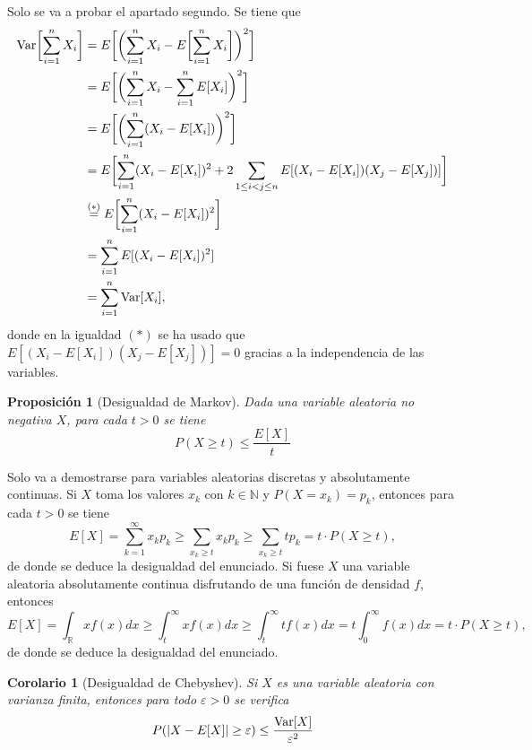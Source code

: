 \documentclass[11pt]{report}
\makeatletter
\renewenvironment{proof}[1][\proofname]{\par
  \pushQED{\qed}%
  \normalfont \topsep\z@skip %
  \trivlist
  \item[\hskip\labelsep
        \itshape
    #1\@addpunct{.}]\ignorespaces
}{%
  \popQED\endtrivlist\@endpefalse
}
\theoremstyle{mytheorem}
\newtheorem{proposition}{Proposición}
\newtheorem{corollary}{Corolario} %
\theoremstyle{mydefinition}
\theoremstyle{myexample}
\let\oldproofname=\proofname
\renewcommand{\proofname}{\rm\bf{\oldproofname}}}
\newenvironment{cproposition} %
  {\begin{mdframed}[
        linewidth=3pt,
        linecolor=c2,
        bottomline=false,
        topline=false,
        rightline=false,
        innerrightmargin=0pt,
        innertopmargin=0pt,
        innerbottommargin=0pt,
        innerleftmargin=1em,
        skipabove=\baselineskip]
    \begin{proposition}}
  {\end{proposition}\end{mdframed}}
\newenvironment{ccorollary} %
  {\begin{mdframed}[
        linewidth=3pt,
        linecolor=c2,
        bottomline=false,
        topline=false,
        rightline=false,
        innerrightmargin=0pt,
        innertopmargin=0pt,
        innerbottommargin=0pt,
        innerleftmargin=1em,
        skipabove=\baselineskip]
    \begin{corollary}}
  {\end{corollary}\end{mdframed}}
\newcommand{\R}{\mathbb R}
\newcommand{\N}{\mathbb N}
\makeatother
\begin{document}
\begin{proof}
Solo se va a probar el apartado segundo. Se tiene que
\[
\begin{aligned}[t]
\textup{Var}\biggl[\sum_{i=1}^n X_i\biggr] &= E\biggl[\biggl(\sum_{i=1}^nX_i-E\biggl[\sum_{i=1}^nX_i\biggr]\biggr)^2\biggr] \\ 
&= E\biggl[\biggl(\sum_{i=1}^nX_i-\sum_{i=1}^n E[X_i]\biggr)^2\biggr] \\
&= E\biggl[\biggl(\sum_{i=1}^n(X_i-E[X_i])\biggr)^2\biggr]\\ 
&= E\biggl[\sum_{i=1}^n(X_i-E[X_i])^2+2\sum_{1\leq i < j \leq n}E[(X_i-E[X_i])(X_j-E[X_j])]\biggr] \\
&\overset{(*)}{=}E\biggl[\sum_{i=1}^n(X_i-E[X_i])^2\biggr] \\
&= \sum_{i=1}^n E[(X_i-E[X_i])^2] \\
&= \sum_{i=1}^n \textup{Var}[X_i],
\end{aligned}
\]
donde en la igualdad $(*)$ se ha usado que $E[(X_i-E[X_i])(X_j-E[X_j])] = 0$ gracias a la independencia de las variables.
\end{proof}

\begin{cproposition}[{Desigualdad de Markov}]
Dada una variable aleatoria no negativa $X$, para cada $t >0$ se tiene
\[P(X \geq t) \leq \frac{E[X]}{t}\]
\end{cproposition}

\begin{proof}
Solo va a demostrarse para variables aleatorias discretas y absolutamente continuas. Si $X$ toma los valores $x_k$ con $k \in \N$ y $P(X = x_k) = p_k$, entonces para cada $t >0$ se tiene
\[E[X]=\sum_{k=1}^\infty x_kp_k \geq \sum_{x_k \geq t} x_kp_k \geq \sum_{x_k \geq t} tp_k = t \cdot P(X \geq t),\]
de donde se deduce la desigualdad del enunciado. Si fuese $X$ una variable aleatoria absolutamente continua disfrutando de una función de densidad $f$, entonces
\[E[X] = \int_\R xf(x) dx \geq \int_t^{\infty}xf(x)dx \geq \int_t^{\infty}tf(x)dx = t \int_0^{\infty}f(x)dx = t \cdot P(X \geq t),\]
de donde se deduce la desigualdad del enunciado.
\end{proof}

\begin{ccorollary}[{Desigualdad de Chebyshev}]
    Si $X$ es una variable aleatoria con varianza finita, entonces para todo $\varepsilon >0$ se verifica
    \[P(|X-E[X]| \geq \varepsilon) \leq \frac{\textup{Var}[X]}{\varepsilon^2}\]
\end{ccorollary}
\end{document}
